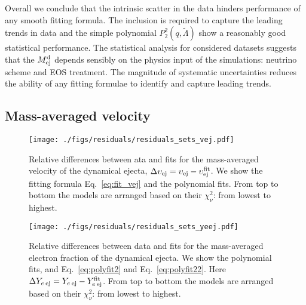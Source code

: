 Overall we conclude that the intrinsic scatter in the data hinders performance 
of any smooth fitting formula. The inclusion \mr{} is required to capture the leading 
trends in data and the simple polynomial $P_2^2(q,\tilde{\Lambda})$ show a reasonably 
good statistical performance.
The statistical analysis for considered datasets suggests that the $M^{\text{d}}_{\text{ej}}$ depends 
sensibly on the physics input of the simulations: neutrino scheme and \ac{EOS} treatment.
The magnitude of systematic uncertainties reduces the ability of any fitting formulae 
to identify and capture leading trends.



\subsection{Mass-averaged velocity}

\begin{figure}[t]
    \centering 
    \texttt{[image: ./figs/residuals/residuals\_sets\_vej.pdf]}
    \caption{
        Relative differences between ata and fits for the mass-averaged velocity of the dynamical ejecta, $\Delta \upsilon_{\rm ej} = \upsilon_{\rm ej} - \upsilon^{\rm fit}_{\rm ej}$.
        We show the fitting formula Eq.~\eqref{eq:fit_vej} and the polynomial fits.
        From top to bottom the models are arranged based on their $\chi_{\nu}^2$: from lowest to highest.
    }
    \label{fig:ejecta:dyn:v}
\end{figure}

\begin{figure}[t]
    \centering 
    \texttt{[image: ./figs/residuals/residuals\_sets\_yeej.pdf]}
    \caption{
        Relative differences between data and fits for the 
        mass-averaged electron fraction of the dynamical ejecta.
        We show the polynomial fits, and Eq.~\eqref{eq:polyfit2} and Eq.~\eqref{eq:polyfit22}.
        Here $\Delta Y_{e\: \rm ej} = Y_{e\: \rm ej} - Y^{\rm fit}_{e\: \rm ej}$.
        From top to bottom the models are arranged based on their $\chi_{\nu}^2$: from lowest to highest.
    }
    \label{fig:ejecta:dyn:y}
\end{figure}